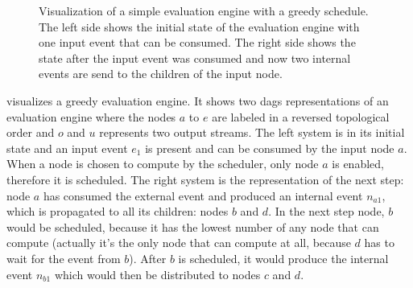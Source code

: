 \begin{figure}
  \hspace{20mm}
  \caption[Visualization of a simple evaluation engine with a greedy schedule.]{Visualization of a simple evaluation engine with a greedy schedule. The left side shows the initial state of the evaluation engine with one input event that can be consumed. The right side shows the state after the input event was consumed and now two internal events are send to the children of the input node.}
  \label{fig:chap5:sec_greedy:visual_dag}
\end{figure}

 visualizes a greedy evaluation engine.
It shows two \glspl{dag} representations of an evaluation engine  where the nodes \(a\) to \(e\) are labeled in a reversed topological order and \(o\) and \(u\) represents two output streams.
The left system is in its initial state and an input event \(e_1\) is present and can be consumed by the input node \(a\).
When a node is chosen to compute by the scheduler, only node \(a\) is enabled, therefore it is scheduled.
The right system is the representation of the next step: node \(a\) has consumed the external event and produced an internal event \(n_{a1}\), which is propagated to all its children: nodes \(b\) and \(d\).
In the next step node, \(b\) would be scheduled, because it has the lowest number of any node that can compute (actually it's the only node that can compute at all, because \(d\) has to wait for the event from \(b\)).
After \(b\) is scheduled, it would produce the internal event \(n_{b1}\) which would then be distributed to nodes \(c\) and \(d\).

